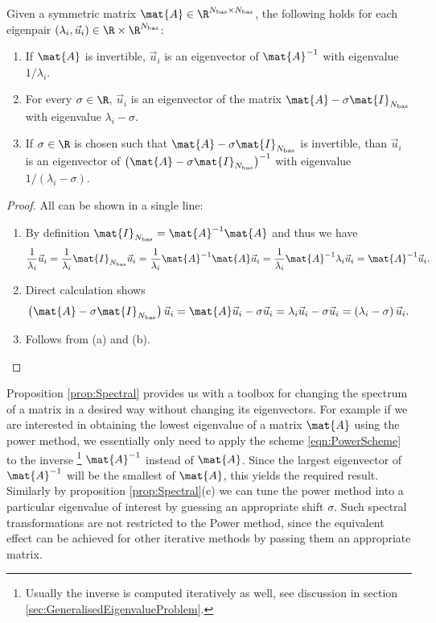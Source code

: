 \begin{prop}
	\label{prop:Spectral}
	Given a symmetric matrix $\mat{A} \in \R^{\Nbas \times \Nbas}$,
	the following holds for each eigenpair
	$(\lambda_i, \vec{u}_i) \in \R \times \R^{\Nbas}$:
	\begin{enumerate}[label=(\alph*)]
		\item If $\mat{A}$ is invertible,
			$\vec{u}_i$ is an eigenvector of $\mat{A}^{-1}$ with eigenvalue
			$1 / \lambda_i$.
		\item For every $\sigma \in \R$, $\vec{u}_i$ is an eigenvector
			of the matrix $\mat{A} - \sigma \mat{I}_{\Nbas}$
			with eigenvalue $\lambda_i - \sigma$.
		\item If $\sigma \in \R$ is chosen such that
			$\mat{A} - \sigma \mat{I}_{\Nbas}$
			is invertible, than  $\vec{u}_i$ is an eigenvector
			of $\left( \mat{A} - \sigma \mat{I}_{\Nbas} \right)^{-1}$
			with eigenvalue $1 / (\lambda_i - \sigma)$.
	\end{enumerate}
	\begin{proof}
		All can be shown in a single line:
		\begin{enumerate}[label=(\alph*)]
			\item By definition $\mat{I}_{\Nbas} = \mat{A}^{-1} \mat{A}$
				and thus we have
				\[ \frac{1}{\lambda_i} \vec{u}_i
					= \frac{1}{\lambda_i} \mat{I}_{\Nbas} \vec{u}_i
					= \frac{1}{\lambda_i} \mat{A}^{-1} \mat{A} \vec{u}_i
					= \frac{1}{\lambda_i} \mat{A}^{-1} \lambda_i \vec{u}_i
					= \mat{A}^{-1} \vec{u}_i.
				\]
			\item Direct calculation shows
				\[ \left( \mat{A} - \sigma \mat{I}_{\Nbas} \right) \vec{u}_i
					= \mat{A} \vec{u}_i - \sigma \vec{u}_i
					= \lambda_i \vec{u}_i - \sigma \vec{u}_i
					= \left( \lambda_i - \sigma  \right) \vec{u}_i.
				\]
			\item Follows from (a) and (b).
		\end{enumerate}
	\end{proof}
\end{prop}

Proposition \ref{prop:Spectral} provides us with a toolbox for
changing the spectrum of a matrix in a desired way without changing its eigenvectors.
For example if we are interested in obtaining
the lowest eigenvalue of a matrix $\mat{A}$ using the power method,
we essentially only need to apply the scheme \eqref{eqn:PowerScheme}
to the inverse%
\footnote{Usually the inverse is computed iteratively as well, see discussion
	in section \ref{sec:GeneralisedEigenvalueProblem}.}
$\mat{A}^{-1}$ instead of $\mat{A}$.
Since the largest eigenvector of $\mat{A}^{-1}$ will be the smallest of $\mat{A}$,
this yields the required result.
Similarly by proposition \ref{prop:Spectral}(c)
we can tune the power method into a particular eigenvalue of interest
by guessing an appropriate shift $\sigma$.
Such spectral transformations are not restricted to the Power method,
since the equivalent effect can be achieved for other iterative
methods by passing them an appropriate matrix.

